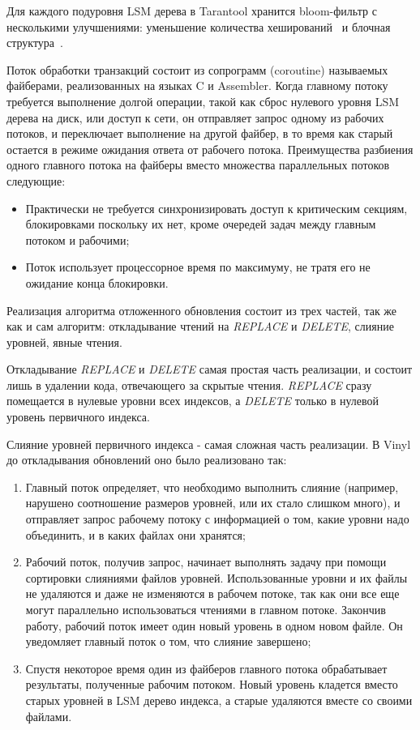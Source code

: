 \documentclass[a4paper,hidelinks,12pt]{article}
\begin{document}
Для каждого подуровня LSM дерева в Tarantool хранится bloom-фильтр с несколькими
улучшениями: уменьшение количества хеширований~\cite{bloom_less_hashing} и
блочная структура~\cite{bloom_blocked}.

Поток обработки транзакций состоит из сопрограмм (coroutine) называемых
файберами, реализованных на языках C и Assembler. Когда главному потоку
требуется выполнение долгой операции, такой как сброс нулевого уровня LSM дерева
на диск, или доступ к сети, он отправляет запрос одному из рабочих потоков, и
переключает выполнение на другой файбер, в то время как старый остается в режиме
ожидания ответа от рабочего потока. Преимущества разбиения одного главного
потока на файберы вместо множества параллельных потоков следующие:
\begin{itemize}
\item Практически не требуется синхронизировать доступ к критическим секциям,
блокировками поскольку их нет, кроме очередей задач между главным потоком и
рабочими;
\item Поток использует процессорное время по максимуму, не тратя его не ожидание
конца блокировки.
\end{itemize}

Реализация алгоритма отложенного обновления состоит из трех частей, так же как и
сам алгоритм: откладывание чтений на \textit{REPLACE} и \textit{DELETE},
слияние уровней, явные чтения.

Откладывание \textit{REPLACE} и \textit{DELETE} самая простая часть реализации,
и состоит лишь в удалении кода, отвечающего за скрытые чтения. \textit{REPLACE}
сразу помещается в нулевые уровни всех индексов, а \textit{DELETE} только в
нулевой уровень первичного индекса.

Слияние уровней первичного индекса - самая сложная часть реализации. В Vinyl
до откладывания обновлений оно было реализовано так:
\begin{enumerate}
\item Главный поток определяет, что необходимо выполнить слияние (например,
нарушено соотношение размеров уровней, или их стало слишком много), и отправляет
запрос рабочему потоку с информацией о том, какие уровни надо объединить, и в
каких файлах они хранятся;
\item Рабочий поток, получив запрос, начинает выполнять задачу при помощи
сортировки слияниями файлов уровней. Использованные уровни и их файлы не
удаляются и даже не изменяются в рабочем потоке, так как они все еще могут
параллельно использоваться чтениями в главном потоке. Закончив работу, рабочий
поток имеет один новый уровень в одном новом файле. Он уведомляет главный поток
о том, что слияние завершено;
\item Спустя некоторое время один из файберов главного потока обрабатывает
результаты, полученные рабочим потоком. Новый уровень кладется вместо старых
уровней в LSM дерево индекса, а старые удаляются вместе со своими файлами.
\end{enumerate}
\end{document}
